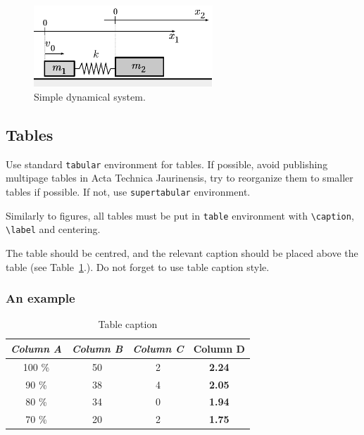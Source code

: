 \documentclass[10pt,a5paper]{article}
\begin{document}
\begin{figure}[htbp]
\begin{center}
  \includegraphics[width=0.6\textwidth]{fig/slbp-bodies.png}
\end{center}
\caption{Simple dynamical system.}
\label{fig:simpledyn}
\end{figure}


\subsection{Tables}

Use standard \verb+tabular+ environment for tables. If possible, avoid
publishing multipage tables in Acta Technica Jaurinensis, try to reorganize
them to smaller tables if possible. If not, use \verb+supertabular+ environment.

Similarly to figures, all tables must be put in \verb+table+ environment
with \verb+\caption+, \verb+\label+ and centering.

The table should be centred, and the relevant caption should be
placed above the table (see Table~\ref{table:simulation}.).
Do not forget to use table caption style.

\subsubsection{An example}

\begin{table}[htbp]
\centering \caption{Table caption}\label{table:simulation}
\begin{tabular}{| c | c | c | c |} \hline
 \textbf{\emph{Column A}} &\textbf{\emph{Column B}} & \textbf{\emph{Column C}} & \textbf{Column D} \\ \hline
  100 \%  	&	50 		&	2		& \textbf{2.24}	   \\ \hline
  90 \%  	&	38 		&	4		& \textbf{2.05}	   \\ \hline
  80 \%  	&	34 		&	0		& \textbf{1.94}	   \\ \hline
  70 \%  	&	20 		&	2		& \textbf{1.75}	   \\ \hline
\end{tabular}
\end{table}
\end{document}
